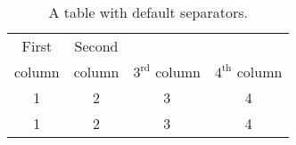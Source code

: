 \begin{table}[h]
    \centering
    \begin{tabular}{c c c c}
        \toprule
        First & Second & & \\ 
        column & column & $\mathrm{3^{rd}}$ column & $\mathrm{4^{th}}$ column
        \tabularnewline\midrule
        1 & 2 & 3 & 4
        \tabularnewline
        1 & 2 & 3 & 4
        \tabularnewline\bottomrule
    \end{tabular}
    \caption{A table with default separators.}
    \label{tab:table3}
\end{table}
